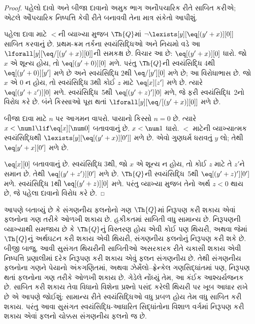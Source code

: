 \begin{proof}
પહેલો દાવો અને બીજા દાવાનો અમુક ભાગ અનૌપચારિક રીતે
સાબિત કરીએ; એટલે ઔપચારિક નિષ્પત્તિ કેવી રીતે
બનાવવી તેના માત્ર સંકેતો આપીશું.

પહેલા દાવા માટે $<$ની વ્યાખ્યા મુજબ $\Th{Q}$માં
$\lnot \lexists[y][\eq[(y'+x)][0]]$ સાબિત કરવાનું છે.
પ્રથમ-ક્રમ તર્કના સ્વયંસિદ્ધિઓ અને નિયમો વડે આ
$\lforall[y][\eq/[(y' + x)][0]]$ની સમકક્ષ છે.
વિચાર આ છે: $\eq[(y'+x)][0]$ ધારો. જો $x$ એ
શૂન્ય હોય, તો $\eq[(y' + 0)][0]$ મળે. પરંતુ
$\Th{Q}$ની સ્વયંસિદ્ધિ 4થી $\eq[(y' + 0)][y']$
મળે છે અને સ્વયંસિદ્ધિ 2થી $\eq/[y'][0]$
મળે છે; આ વિરોધાભાસ છે. જો $x$ એ $0$
ન હોય, તો સ્વયંસિદ્ધિ 3થી કોઈ $z$ માટે
$\eq[x][z']$ મળે છે. ત્યારે
$\eq[(y' + z')][0]$ મળે. સ્વયંસિદ્ધિ~5થી
$\eq[(y' + z)'][0]$ મળે, જે ફરી
સ્વયંસિદ્ધિ~2નો વિરોધ કરે છે. બંને કિસ્સાઓ
પૂરા થતાં $\lforall[y][\eq/[(y' +x)][0]]$ મળે છે.


બીજા દાવા માટે $n$ પર આગમન વાપરો. પાયાનો
કિસ્સો $n =0$ છે. ત્યારે
$x < \num 1 \lif \eq[x][\num 0]$ બતાવવાનું છે.
$x < \num 1$ ધારો. $<$ માટેની વ્યાખ્યાત્મક
સ્વયંસિદ્ધિથી $\lexists[y][\eq[(y'+x)][0']]$
મળે છે. એવો ગુણધર્મ ધરાવતું $y$ લો;
તેથી $\eq[y'+x][0']$ મળે છે.

$\eq[x][0]$ બતાવવાનું છે. સ્વયંસિદ્ધિ 3થી,
જો $x$ એ શૂન્ય ન હોય, તો કોઈ $z$ માટે તે
$z'$ને સમાન છે. તેથી $\eq[(y' + z')][0']$
મળે છે. $\Th{Q}$ની સ્વયંસિદ્ધિ~5થી
$\eq[(y'+z)'][0']$ મળે. સ્વયંસિદ્ધિ 1થી
$\eq[(y' + z)][0]$ મળે. પરંતુ વ્યાખ્યા મુજબ
તેનો અર્થ $z < 0$ થાય છે, જે પહેલા દાવાનો
વિરોધ કરે છે.

\end{proof}

\begin{explain}
આપણે બતાવ્યું છે કે સંગણનીય ફલનોનો ગણ
$\Th{Q}$માં નિરૂપણ કરી શકાય એવાં
ફલનોના ગણ તરીકે ઓળખી શકાય છે. હકીકતમાં
સાબિતી વધુ સામાન્ય છે. નિરૂપણની
વ્યાખ્યાથી સમજાય છે કે $\Th{Q}$નું વિસ્તરણ
હોય એવી કોઈ પણ થિયરી, અથવા જેમાં $\Th{Q}$નું
અર્થઘટન કરી શકાય એવી થિયરી, સંગણનીય
ફલનોનું નિરૂપણ કરી શકે છે. બીજી
બાજુ, આવી સુસંગત થિયરીની સાબિતીઓ અસરકારક રીતે
ચકાસી શકાય એવી નિષ્પત્તિ પ્રણાલીમાં દરેક
નિરૂપણ કરી શકાય એવું ફલન
સંગણનીય છે. તેથી સંગણનીય ફલનોના
ગણને પેયાનો અંકગણિતમાં, અથવા ઝેર્મેલો--ફ્રેન્કેલ
ગણસિદ્ધાંતમાં પણ, નિરૂપણ થતાં
ફલનોના ગણ તરીકે ઓળખી શકાય છે.
ગેડેલે નોંધ્યું તેમ, આ કંઈક આશ્ચર્યજનક છે.
સાબિત કરી શકાય તેવા વિધાનો વિશેના પ્રશ્નો
પસંદ કરેલી થિયરી પર ખૂબ આધાર રાખે છે
એ આપણે જોઈશું: સામાન્ય રીતે સ્વયંસિદ્ધિઓ
વધુ પ્રબળ હોય તેમ વધુ સાબિત કરી શકાય.
પરંતુ આવા સુસંગત સ્વયંસિદ્ધિ-આધારિત સિદ્ધાંતોના
વિશાળ વર્ગમાં નિરૂપણ કરી શકાય
એવાં ફલનો ચોક્કસ સંગણનીય ફલનો જ છે.
\end{explain}
\endgroup

